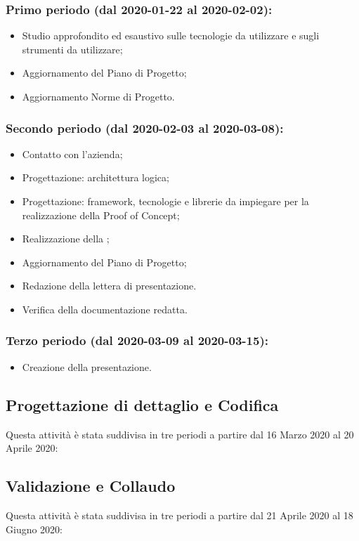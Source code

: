 		\subsubsection{Primo periodo (dal 2020-01-22 al 2020-02-02):}
			\begin{itemize}
			 	\item Studio approfondito ed esaustivo sulle tecnologie da utilizzare e sugli strumenti da utilizzare;
			 	\item Aggiornamento del Piano di Progetto;
			 	\item Aggiornamento Norme di Progetto.
			\end{itemize} 	
		
		\subsubsection{Secondo periodo (dal 2020-02-03 al 2020-03-08):}
			\begin{itemize}
				\item Contatto con l'azienda;
				\item Progettazione: architettura logica;
				\item Progettazione: framework, tecnologie e librerie da impiegare per la realizzazione della Proof of Concept;
				\item Realizzazione della ;
				\item Aggiornamento del Piano di Progetto;
				\item Redazione della lettera di presentazione.
				\item Verifica della documentazione redatta.
			\end{itemize}

		\subsubsection{Terzo periodo (dal 2020-03-09 al 2020-03-15):}
			\begin{itemize}
				\item Creazione della presentazione.
			\end{itemize}

	\subsection{Progettazione di dettaglio e Codifica}
	Questa attività è stata suddivisa in tre periodi a partire dal 16 Marzo 2020 al 20 Aprile 2020:
	
	
	\subsection{Validazione e Collaudo}		
	Questa attività è stata suddivisa in tre periodi a partire dal 21 Aprile 2020 al 18 Giugno 2020:

